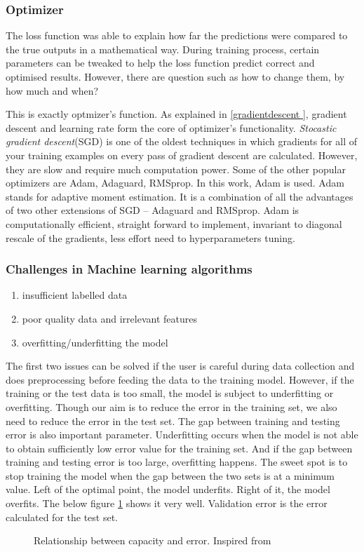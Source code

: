 \subsubsection*{Optimizer}
The loss function was able to explain how far the predictions were compared to the true
outputs in a mathematical way. During training process, certain parameters can be tweaked
to help the loss function predict correct and optimised results. However, there are
question such as how to change them, by how much and when?

This is exactly optmizer's function. As explained in \ref{gradientdescent }, gradient
descent and learning rate form the core of optimizer's functionality. \textit{Stocastic
gradient descent}(SGD) is one of the oldest techniques in which gradients for all of your
training examples on every pass of gradient descent are calculated. However, they are slow
and require much computation power. Some of the other popular optimizers are Adam,
Adaguard, RMSprop. In this work, Adam is used. Adam stands for adaptive moment estimation.
It is a combination of all the advantages of two other extensions of SGD -- Adaguard and
RMSprop. Adam is computationally efficient, straight forward to implement, invariant to
diagonal rescale of the gradients, less effort need to hyperparameters tuning.

\subsubsection*{Challenges in Machine learning algorithms}
\begin{enumerate}
    \item insufficient labelled data
    \item poor quality data and irrelevant features
    \item overfitting/underfitting the model
\end{enumerate}

The first two issues can be solved if the user is careful during data collection and does
preprocessing before feeding the data to the training model. However, if the training or
the test data is too small, the model is subject to underfitting or overfitting. Though
our aim is to reduce the error in the training set, we also need to reduce the error in
the test set. The gap between training and testing error is also important parameter.
Underfitting occurs when the model is not able to obtain sufficiently low error value for
the training set. And if the gap between training and testing error is too large,
overfitting happens. The sweet spot is to stop training the model when the gap between the
two sets is at a minimum value. Left of the optimal point, the model underfits. Right of
it, the model overfits. The below figure \ref{fig:overfittingunderfitting} shows it very
well. Validation error is the error calculated for the test set.
\begin{figure}[h]
	\centering
    \def\svgwidth{0.75\textwidth}
    \caption{Relationship between capacity and error. Inspired from
    \cite{Goodfellow-et-al-2016}}
    \label{fig:overfittingunderfitting}
\end{figure}


